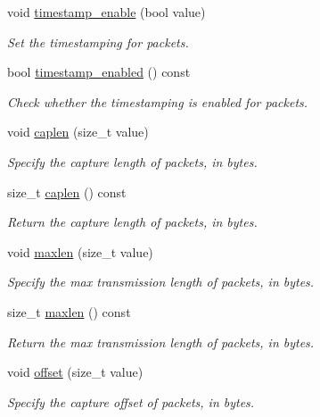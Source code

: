 \begin{DoxyCompactItemize}
void \hyperlink{classnet_1_1pfq_ac8dc23932b27dd04c8ecbdcbabe931b8}{timestamp\-\_\-enable} (bool value)
\begin{DoxyCompactList}\small\item\em Set the timestamping for packets. \end{DoxyCompactList}\item 
bool \hyperlink{classnet_1_1pfq_a7939df6cf5127dd8672e1ca0a68fa648}{timestamp\-\_\-enabled} () const 
\begin{DoxyCompactList}\small\item\em Check whether the timestamping is enabled for packets. \end{DoxyCompactList}\item 
void \hyperlink{classnet_1_1pfq_aa915603b2ad8d1226f9bbea0050945c0}{caplen} (size\-\_\-t value)
\begin{DoxyCompactList}\small\item\em Specify the capture length of packets, in bytes. \end{DoxyCompactList}\item 
size\-\_\-t \hyperlink{classnet_1_1pfq_aa0d64b89a345ca5426a694f6583106c3}{caplen} () const 
\begin{DoxyCompactList}\small\item\em Return the capture length of packets, in bytes. \end{DoxyCompactList}\item 
void \hyperlink{classnet_1_1pfq_a0424e39990711493af4f24a0c3e9be4d}{maxlen} (size\-\_\-t value)
\begin{DoxyCompactList}\small\item\em Specify the max transmission length of packets, in bytes. \end{DoxyCompactList}\item 
size\-\_\-t \hyperlink{classnet_1_1pfq_a869695c441902d0342212d7581f3e362}{maxlen} () const 
\begin{DoxyCompactList}\small\item\em Return the max transmission length of packets, in bytes. \end{DoxyCompactList}\item 
void \hyperlink{classnet_1_1pfq_a83ed78c8c7bc2de33e75e244bbc0b603}{offset} (size\-\_\-t value)
\begin{DoxyCompactList}\small\item\em Specify the capture offset of packets, in bytes. \end{DoxyCompactList}\item 

\end{DoxyCompactItemize}
